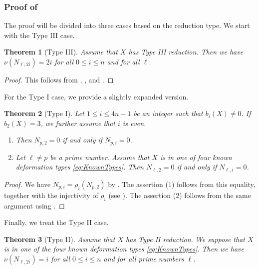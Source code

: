 \documentclass[12pt,reqno]{amsart}
\newtheorem{thm}{Theorem}[section]
\theoremstyle{definition}
\numberwithin{equation}{section}
\begin{document}
\subsubsection*{Proof of }
The proof will be divided into three cases based on the reduction type.  We start with the Type III case.
\begin{thm}[Type III]
\label{thm:nagai for type III}
    Assume that $X$ has Type III reduction.
    Then we have
$
\nu (N_{\ell,2i}) =2i
$
for all $0 \leq i \leq n$ and for all $\ell$.
\end{thm}

\begin{proof}
    This follows from 
    , , and .
\end{proof}

For the Type I case, we provide a slightly expanded version.

\begin{thm}[Type I]
\label{thm:nagai for type I}
Let $1 \leq i \leq 4n-1$ be an integer such that $b_i(X) \neq 0$.
If $b_2(X) = 3$, we further assume that $i$ is even.
\begin{enumerate}
    \item Then $N_{p, 2}=0$ if and only if $N_{p, i}=0$.
    \item Let $\ell \neq p$ be a prime number. Assume that $X$ is in one of four known deformation types \eqref{eq:KnownTypes}.
    Then $N_{\ell, 2}=0$ if and only if $N_{\ell, i}=0$.
\end{enumerate}
\end{thm}

\begin{proof}
    We have $N_{p, i}=\rho_{i}(N_{p, 2})$ by .
    The assertion (1) follows from this equality, together with the injectivity of $\rho_i$ (see ).
    The assertion (2) follows from the same argument using .
\end{proof}

Finally, we treat the Type II case.
\begin{thm}[Type II]
\label{thm:nagai for type II and known case}
Assume that $X$ has Type II reduction.
We suppose that $X$ is in one of the four known deformation types \eqref{eq:KnownTypes}.
    Then we have
    $\nu (N_{\ell,2i}) = i$ for all $0 \leq i \leq n$ and for all prime numbers $\ell$.
\end{thm}
\end{document}
